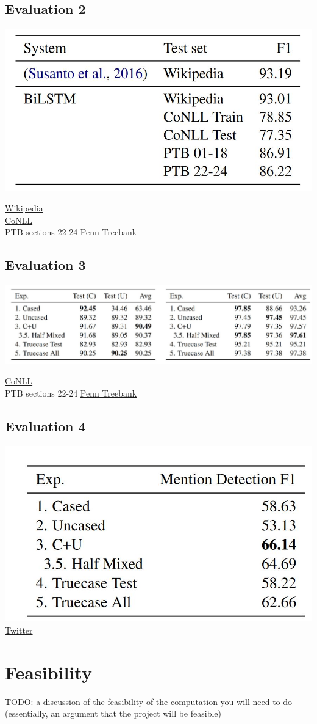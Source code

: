 \documentclass{article}
\begin{document}
\subsection*{Evaluation 2}
\includegraphics{stat2}

\noindent
\href{https://www.aclweb.org/anthology/W11-1601.pdf}{Wikipedia}\\
\href{https://dl.acm.org/doi/10.3115/1119176.1119195}{CoNLL}\\
PTB sections 22-24 \href{https://www.seas.upenn.edu/~pdtb/}{Penn Treebank}



\subsection*{Evaluation 3}
\includegraphics{stat3}

\noindent
\href{https://dl.acm.org/doi/10.3115/1119176.1119195}{CoNLL}\\
PTB sections 22-24 \href{https://www.seas.upenn.edu/~pdtb/}{Penn Treebank}


\subsection*{Evaluation 4}
\includegraphics{stat4}
\href{https://github.com/GateNLP/broad_twitter_corpus}{Twitter}




\section{Feasibility}
TODO: a discussion of the feasibility of the computation you will need to do (essentially, an argument that the project will be feasible)
\end{document}
